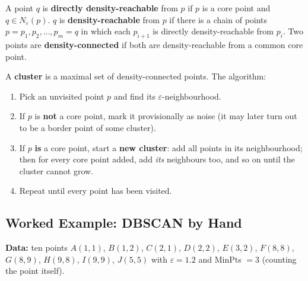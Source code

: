 \begin{definition}
A point $q$ is \textbf{directly density-reachable} from $p$ if $p$ is a core point and $q\in N_\varepsilon(p)$. $q$ is \textbf{density-reachable} from $p$ if there is a chain of points $p=p_1,p_2,\dots,p_m=q$ in which each $p_{i+1}$ is directly density-reachable from $p_i$. Two points are \textbf{density-connected} if both are density-reachable from a common core point.
\end{definition}

\begin{definition}
A \textbf{cluster} is a maximal set of density-connected points. The algorithm:
\begin{enumerate}
  \item Pick an unvisited point $p$ and find its $\varepsilon$-neighbourhood.
  \item If $p$ is \textbf{not} a core point, mark it provisionally as noise (it may later turn out to be a border point of some cluster).
  \item If $p$ \textbf{is} a core point, start a \textbf{new cluster}: add all points in its neighbourhood; then for every core point added, add \emph{its} neighbours too, and so on until the cluster cannot grow.
  \item Repeat until every point has been visited.
\end{enumerate}
\end{definition}

\subsection{Worked Example: DBSCAN by Hand}

\textbf{Data:} ten points $A(1,1)$, $B(1,2)$, $C(2,1)$, $D(2,2)$, $E(3,2)$, $F(8,8)$, $G(8,9)$, $H(9,8)$, $I(9,9)$, $J(5,5)$ with $\varepsilon=1.2$ and MinPts $=3$ (counting the point itself).


